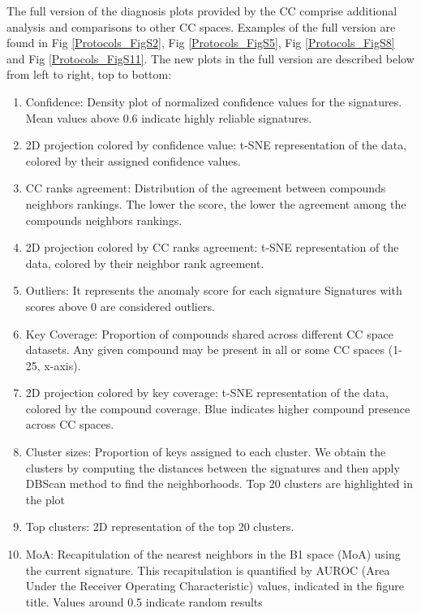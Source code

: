 The full version of the diagnosis plots provided by the CC comprise additional analysis and comparisons to other CC spaces. Examples of the full version are found in Fig \ref{Protocols_FigS2}, Fig \ref{Protocols_FigS5}, Fig \ref{Protocols_FigS8} and Fig \ref{Protocols_FigS11}. The new plots in the full version are described below from left to right, top to bottom:
\begin{enumerate}
    \item[\textbullet]Confidence: Density plot of normalized confidence values for the signatures.  Mean values above 0.6 indicate highly reliable signatures.
    \item[\textbullet]2D projection colored by confidence value: t-SNE representation of the data, colored by their assigned confidence values.
    \item[\textbullet]CC ranks agreement: Distribution of the agreement between compounds neighbors rankings. The lower the score, the lower the agreement among the compounds neighbors rankings. 
    \item[\textbullet]2D projection colored by CC ranks agreement:  t-SNE representation of the data, colored by their neighbor rank agreement. 
    \item[\textbullet]Outliers: It represents the anomaly score for each signature Signatures with scores above 0 are considered outliers.
    \item[\textbullet]Key Coverage: Proportion of compounds shared across different CC space datasets. Any given compound may be present in all or some CC spaces (1-25, x-axis).
    \item[\textbullet]2D projection colored by key coverage: t-SNE representation of the data, colored by the compound coverage. Blue indicates higher compound presence across CC spaces. 
    \item[\textbullet]Cluster sizes: Proportion of keys assigned to each cluster. We obtain the clusters by computing the distances between the signatures and then apply DBScan method to find the neighborhoods. Top 20 clusters are highlighted in the plot
    \item[\textbullet]Top clusters: 2D representation of the top 20 clusters. 
    \item[\textbullet]MoA: Recapitulation of the nearest neighbors in the B1 space (MoA) using the current signature. This recapitulation is quantified by AUROC (Area Under the Receiver Operating Characteristic) values, indicated in the figure title. Values around 0.5 indicate random results

\end{enumerate}
